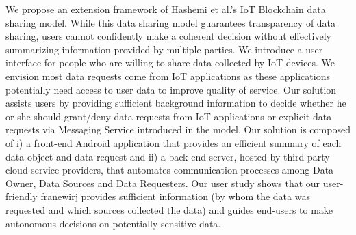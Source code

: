 We propose an extension framework of Hashemi et al.'s \cite{campbell} IoT Blockchain data sharing model. While this data sharing model guarantees transparency of data sharing, users cannot confidently make a coherent decision without effectively summarizing information provided by multiple parties. We introduce a user interface for people who are willing to share data collected by IoT devices. We envision most data requests come from IoT applications as these applications potentially need access to user data to improve quality of service. Our solution assists users by providing sufficient background information to decide whether he or she should grant/deny data requests from IoT applications or explicit data requests via Messaging Service introduced in the model. Our solution is composed of i) a front-end Android application that provides an efficient summary of each data object and data request and ii) a back-end server, hosted by third-party cloud service providers, that automates communication processes among Data Owner, Data Sources and Data Requesters. Our user study shows that our user-friendly franewirj provides sufficient information (by whom the data was requested and which sources collected the data) and guides end-users to make autonomous decisions on potentially sensitive data.